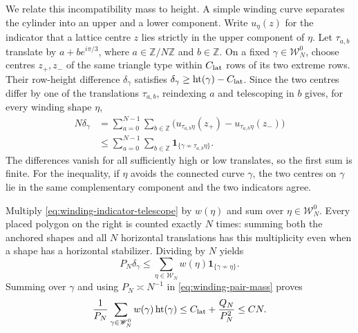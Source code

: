 We relate this incompatibility mass to height. A simple winding curve
separates the cylinder into an upper and a lower component. Write
$u_\eta(z)$ for the indicator that a lattice centre $z$ lies strictly in
the upper component of $\eta$. Let $\tau_{a,b}$ translate by
$a+b e^{i\pi/3}$, where $a\in\mathbb Z/N\mathbb Z$ and $b\in\mathbb Z$.
On a fixed $\gamma\in\mathscr W_N^0$, choose centres $z_+,z_-$ of the same
triangle type within $C_{\rm lat}$ rows of its two extreme rows. Their
row-height difference $\delta_\gamma$ satisfies
$\delta_\gamma\ge\operatorname{ht}(\gamma)-C_{\rm lat}$. Since the two
centres differ by one of the translations $\tau_{a,b}$, reindexing $a$ and
telescoping in $b$ gives, for every winding shape $\eta$,
\begin{equation}\label{eq:winding-indicator-telescope}
 \begin{split}
 N\delta_\gamma
 &=\sum_{a=0}^{N-1}\sum_{b\in\mathbb Z}
       \bigl(u_{\tau_{a,b}\eta}(z_+)
             -u_{\tau_{a,b}\eta}(z_-)\bigr)\\
 &\le\sum_{a=0}^{N-1}\sum_{b\in\mathbb Z}
       \mathbf1_{\{\gamma\not\sim\tau_{a,b}\eta\}}.
 \end{split}
\end{equation}
The differences vanish for all sufficiently high or low translates, so
the first sum is finite. For the inequality, if $\eta$ avoids the
connected curve $\gamma$, the two centres on $\gamma$ lie in the same
complementary component and the two indicators agree.

Multiply \eqref{eq:winding-indicator-telescope} by $w(\eta)$ and sum over
$\eta\in\mathscr W_N^0$. Every placed polygon on the right is counted
exactly $N$ times: summing both the anchored shapes and all $N$ horizontal
translations has this multiplicity even when a shape has a horizontal
stabilizer. Dividing by $N$ yields
\[
 P_N\delta_\gamma\le
 \sum_{\eta\in\mathscr W_N}w(\eta)
             \mathbf1_{\{\gamma\not\sim\eta\}}.
\]
Summing over $\gamma$ and using $P_N\asymp N^{-1}$ in
\eqref{eq:winding-pair-mass} proves
\begin{equation}\label{eq:winding-height}
 \frac1{P_N}\sum_{\gamma\in\mathscr W_N^0}
          w(\gamma)\operatorname{ht}(\gamma)
 \le C_{\rm lat}+\frac{Q_N}{P_N^2}\le C N.
\end{equation}

